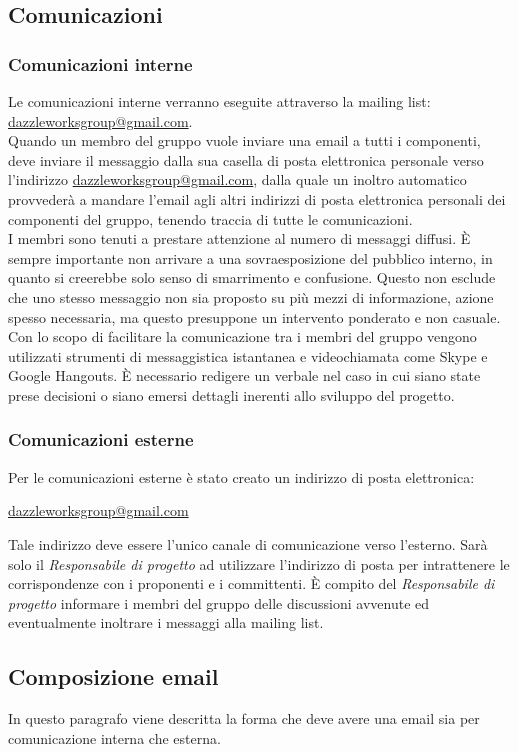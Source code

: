 	\subsection{Comunicazioni}
		\subsubsection{Comunicazioni interne}
Le comunicazioni interne verranno eseguite attraverso la \gls{mailing list}: \url{dazzleworksgroup@gmail.com}. \\ 
Quando un membro del gruppo vuole inviare una email a tutti i componenti, deve inviare il messaggio dalla sua casella di posta elettronica personale verso l'indirizzo \url{dazzleworksgroup@gmail.com}, dalla quale un inoltro automatico provvederà a mandare l'email agli altri indirizzi di posta elettronica personali dei componenti del gruppo, tenendo traccia di tutte le comunicazioni.\\ 
I membri sono tenuti a prestare attenzione al numero di messaggi diffusi. È sempre importante non arrivare a una sovraesposizione del pubblico interno, in quanto si creerebbe solo senso di smarrimento e confusione. Questo non esclude che uno stesso messaggio non sia proposto su più mezzi di informazione, azione spesso necessaria, ma questo presuppone un intervento ponderato e non casuale.\\
Con lo scopo di facilitare la comunicazione tra i membri del gruppo vengono utilizzati strumenti di messaggistica istantanea e videochiamata come Skype e Google Hangouts.
È necessario redigere un \gls{verbale} nel caso in cui siano state prese decisioni o siano emersi dettagli inerenti allo sviluppo del progetto. 
		\subsubsection{Comunicazioni esterne}
Per le comunicazioni esterne è stato creato un indirizzo di posta elettronica:
\begin{center}
\url{dazzleworksgroup@gmail.com}
\end{center}
Tale indirizzo deve essere l'unico canale di comunicazione verso l'esterno. Sarà solo il \textit{Responsabile di progetto} ad utilizzare l'indirizzo di posta per intrattenere le corrispondenze con i proponenti e i committenti. È compito del \textit{Responsabile di progetto} informare i membri del gruppo delle discussioni avvenute ed eventualmente inoltrare i messaggi alla \gls{mailing list}.

	\subsection{Composizione email}
In questo paragrafo viene descritta la forma che deve avere una email sia per comunicazione interna che esterna.
